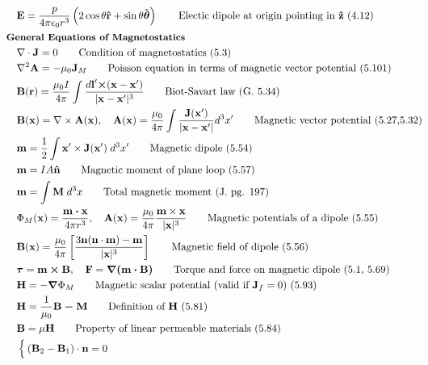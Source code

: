 \documentclass[10pt]{article}
\newcommand{\rhat}{\boldsymbol{\hat{\textbf{r}}}}
\newcommand{\zhat}{\boldsymbol{\hat{\textbf{z}}}}
\newcommand{\nhat}{\boldsymbol{\hat{\textbf{n}}}}
\newcommand{\thetahat}{\boldsymbol{\hat{\textbf{$\theta$}}}}
\newcommand{\ve}[1]{\boldsymbol{\mathbf{#1}}}
\newcommand{\vect}[1]{\boldsymbol{\mathbf{#1}}}
\newcommand{\eo}{\epsilon_0}
\newcommand{\lrp}[1]{\left( #1 \right)}
\begin{document}
\begin{multicols}{2}
\begin{align*}
		& \ve{E} = \frac{p}{4 \pi \eo r^3}\lrp{2 \cos \theta \rhat + \sin \theta \thetahat} \tag*{Electic dipole at origin pointing in $\zhat$ (4.12)} \\	
	& \small \hspace{-10pt} \textbf{General Equations of Magnetostatics} \small \\
		& \nabla \cdot \vect{J} = 0 \tag*{Condition of magnetostatics (5.3)} \\
		& \nabla^2 \vect{A} = -\mu_0 \vect{J}_M \tag*{Poisson equation in terms of magnetic vector potential (5.101)} \\
		& \ve{B}(\ve{r}) = \frac{\mu_0 I}{4 \pi} \int \frac{d\ve{l}' \ve{\times} (\ve{x} - \ve{x}')}{|\ve{x} - \ve{x}'|^3} \tag*{Biot-Savart law (G. 5.34)} \\
		& \vect{B}(\vect{x}) = \nabla \times \vect{A}(\vect{x}), \quad \vect{A}(\vect{x}) = \frac{\mu_0}{4 \pi} \int \frac{\vect{J}(\vect{x}')}{|\vect{x}-\vect{x}'|} d^3 x' \tag*{Magnetic vector potential (5.27,5.32)} \\
		& \vect{m} = \frac{1}{2} \int \vect{x}' \times \vect{J}(\vect{x}') \; d^3 x'	\tag*{Magnetic dipole (5.54)} \\
		& \vect{m} = IA \nhat \tag*{Magnetic moment of plane loop (5.57)} \\
		& \ve{m} = \int \ve{M} \; d^3 x \tag*{Total magnetic moment (J. pg. 197)} \\
		& \Phi_M(\vect{x}) = \frac{\vect{m \cdot x}}{4 \pi r^3}, \quad \vect{A}(\vect{x}) = \frac{\mu_0}{4 \pi} \frac{\vect{m} \times \vect{x}}{|\vect{x}|^3} \tag*{Magnetic potentials of a dipole (5.55)} \\
		& \vect{B}(\vect{x}) = \frac{\mu_0}{4 \pi} \left[ \frac{3 \vect{n}(\vect{n} \cdot \vect{m}) - \vect{m}}{|\vect{x}|^3} \right]\tag*{Magnetic field of dipole (5.56)}\\
		& \ve{\tau} = \ve{m \times B}, \quad \vect{F} = \vect{\nabla(m \cdot B)} \tag*{Torque and force on magnetic dipole (5.1, 5.69)} \\
		& \vect{H} = -\vect{\nabla} \Phi_M \tag*{Magnetic scalar potential (valid if $\ve{J}_f = 0$) (5.93)} \\
		& \vect{H} = \frac{1}{\mu_0} \vect{B - M} \tag*{Definition of $\ve{H}$ (5.81)} \\
		& \vect{B} = \mu \vect{H} \tag*{Property of linear permeable materials (5.84)} \\
		&\begin{cases}
			(\vect{B}_2 - \vect{B}_1) \cdot \vect{n} = 0 \\

\end{cases}
\end{align*}
\end{multicols}
\end{document}
